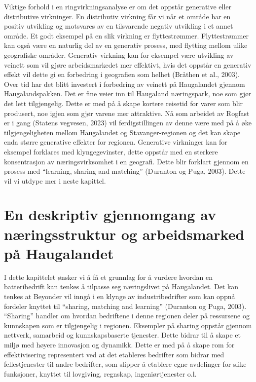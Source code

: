 \documentclass[
]{article}
\begin{document}
Viktige forhold i en ringvirkningsanalyse er om det oppstår generative
eller distributive virkninger. En distributiv virkning får vi når et
område har en positiv utvikling og motsvares av en tilsvarende negativ
utvikling i et annet område. Et godt eksempel på en slik virkning er
flyttestrømmer. Flyttestrømmer kan også være en naturlig del av en
generativ prosess, med flytting mellom ulike geografiske områder.
Generativ virkning kan for eksempel være utvikling av veinett som vil
gjøre arbeidsmarkedet mer effektivt, hvis det oppstår en generativ
effekt vil dette gi en forbedring i geografien som helhet (Bråthen et
al., 2003). Over tid har det blitt investert i forbedring av veinett på
Haugalandet gjennom Haugalandspakken. Det er fine veier inn til
Haugaland næringspark, noe som gjør det lett tilgjengelig. Dette er med
på å skape kortere reisetid for varer som blir produsert, noe igjen som
gjør varene mer attraktive. Nå som arbeidet av Rogfast er i gang
(Statens vegvesen, 2023) vil ferdigstillingen av denne være med på å øke
tilgjengeligheten mellom Haugalandet og Stavanger-regionen og det kan
skape enda større generative effekter for regionen. Generative
virkninger kan for eksempel forklares med klyngegevinster, dette oppstår
med en sterkere konsentrasjon av næringsvirksomhet i en geografi. Dette
blir forklart gjennom en prosess med ``learning, sharing and matching''
(Duranton og Puga, 2003). Dette vil vi utdype mer i neste kapittel.

\newpage

\hypertarget{en-deskriptiv-gjennomgang-av-nuxe6ringsstruktur-og-arbeidsmarked-puxe5-haugalandet}{%
\section{En deskriptiv gjennomgang av næringsstruktur og arbeidsmarked
på
Haugalandet}\label{en-deskriptiv-gjennomgang-av-nuxe6ringsstruktur-og-arbeidsmarked-puxe5-haugalandet}}

I dette kapittelet ønsker vi å få et grunnlag for å vurdere hvordan en
batteribedrift kan tenkes å tilpasse seg næringslivet på Haugalandet.
Det kan tenkes at Beyonder vil inngå i en klynge av industribedrifter
som kan oppnå fordeler knyttet til ``sharing, matching and learning''
(Duranton og Puga, 2003). ``Sharing'' handler om hvordan bedriftene i
denne regionen deler på ressursene og kunnskapen som er tilgjengelig i
regionen. Eksempler på sharing oppstår gjennom nettverk, samarbeid og
kunnskapsbaserte tjenester. Dette bidrar til å skape et miljø med høyere
innovasjon og dynamikk. Dette er med på å skape rom for effektivisering
representert ved at det etableres bedrifter som bidrar med
fellestjenester til andre bedrifter, som slipper å etablere egne
avdelinger for slike funksjoner, knyttet til lovgiving, regnskap,
ingeniørtjenester o.l.
\end{document}
